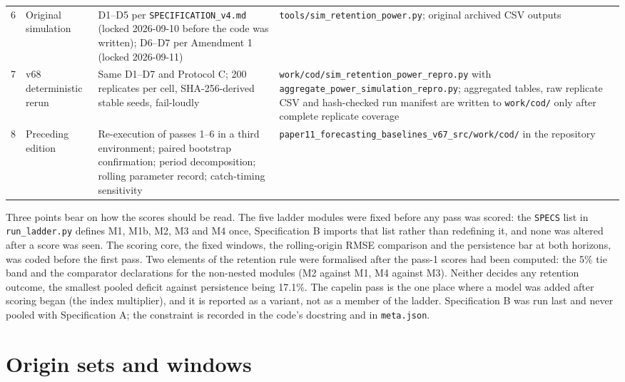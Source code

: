 \documentclass[preprint,11pt,authoryear]{elsarticle}
\theoremstyle{remark}
\begin{document}
\begin{table}[!htb]
\begin{tabularx}{\textwidth}{@{}clLL@{}}
6 & Original simulation & D1--D5 per \texttt{SPECIFICATION\_\allowbreak{}v4.md} (locked 2026-09-10 before the code was written); D6--D7 per Amendment 1 (locked 2026-09-11) & \texttt{tools/\allowbreak{}sim\_\allowbreak{}retention\_\allowbreak{}power.py}; original archived CSV outputs \\
7 & v68 deterministic rerun & Same D1--D7 and Protocol C; 200 replicates per cell, SHA-256-derived stable seeds, fail-loudly & \texttt{work/cod/\allowbreak{}sim\_\allowbreak{}retention\_\allowbreak{}power\_\allowbreak{}repro.py} with \texttt{aggregate\_\allowbreak{}power\_\allowbreak{}simulation\_\allowbreak{}repro.py}; aggregated tables, raw replicate CSV and hash-checked run manifest are written to \texttt{work/cod/} only after complete replicate coverage \\
8 & Preceding edition & Re-execution of passes 1--6 in a third environment; paired bootstrap confirmation; period decomposition; rolling parameter record; catch-timing sensitivity & \texttt{paper11\_\allowbreak{}forecasting\_\allowbreak{}baselines\_\allowbreak{}v67\_\allowbreak{}src/\allowbreak{}work/\allowbreak{}cod/\allowbreak{}} in the repository \\
\bottomrule
\end{tabularx}
\end{table}

Three points bear on how the scores should be read. The five ladder modules were fixed before any pass was scored: the \texttt{SPECS} list in \texttt{run\_ladder.py} defines M1, M1b, M2, M3 and M4 once, Specification B imports that list rather than redefining it, and none was altered after a score was seen. The scoring core, the fixed windows, the rolling-origin RMSE comparison and the persistence bar at both horizons, was coded before the first pass. Two elements of the retention rule were formalised after the pass-1 scores had been computed: the 5\% tie band and the comparator declarations for the non-nested modules (M2 against M1, M4 against M3). Neither decides any retention outcome, the smallest pooled deficit against persistence being 17.1\%. The capelin pass is the one place where a model was added after scoring began (the index multiplier), and it is reported as a variant, not as a member of the ladder. Specification B was run last and never pooled with Specification A; the constraint is recorded in the code's docstring and in \texttt{meta.json}.

\section{Origin sets and windows}\label{si:origins}
\end{document}
